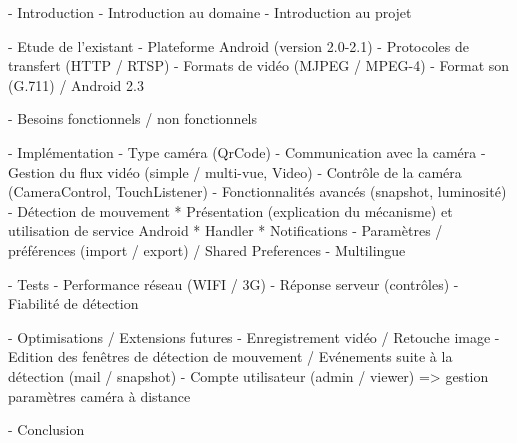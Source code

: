 - Introduction
  - Introduction au domaine
  - Introduction au projet

- Etude de l'existant
  - Plateforme Android (version 2.0-2.1)
  - Protocoles de transfert (HTTP / RTSP)
  - Formats de vidéo (MJPEG / MPEG-4)
  - Format son (G.711) / Android 2.3

- Besoins fonctionnels / non fonctionnels

- Implémentation
  - Type caméra (QrCode)
  - Communication avec la caméra
  - Gestion du flux vidéo (simple / multi-vue, Video)
  - Contrôle de la caméra (CameraControl, TouchListener)
  - Fonctionnalités avancés (snapshot, luminosité)
  - Détection de mouvement
    * Présentation (explication du mécanisme) et utilisation de service Android
    * Handler
    * Notifications
  - Paramètres / préférences (import / export) / Shared Preferences
  - Multilingue

- Tests
  - Performance réseau (WIFI / 3G)
  - Réponse serveur (contrôles)
  - Fiabilité de détection

- Optimisations / Extensions futures
  - Enregistrement vidéo / Retouche image
  - Edition des fenêtres de détection  de mouvement / Evénements suite à
    la détection (mail / snapshot)
  - Compte utilisateur (admin / viewer) => gestion paramètres caméra à distance

- Conclusion